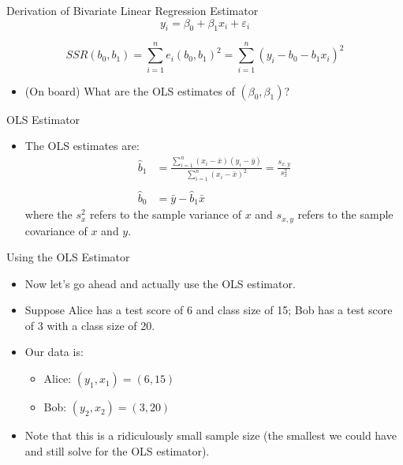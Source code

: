 \documentclass[english,xcolor={dvipsnames},aspectratio=169]{beamer}
\begin{document}


\begin{frame}{Derivation of Bivariate Linear Regression Estimator}
\[
	y_i = \beta_0 + \beta_1 x_i + \varepsilon_i
	\]

\[
		SSR\left(b_0,b_1\right) = \sum_{i=1}^{n} e_i \left(b_0,b_1\right)^2  =  \sum_{i=1}^{n} \left(y_i - b_{0} - b_{1} x_{i}\right)^{2} 
	\]


	\begin{itemize}
		\item (On board) What are the OLS estimates of $\left(\beta_0,\beta_1\right)$?
	\end{itemize}
\end{frame}

\begin{frame}{OLS Estimator}
	\begin{itemize}
\item The OLS estimates are:
\begin{align*}
\hat{b}_1 &=\frac{\sum\limits_{i=1}^n(x_i-\bar{x})(y_i-\bar{y})}{\sum\limits_{i=1}^n(x_i-\bar{x})^2}=\frac{s_{x,y}}{s_{x}^{2}} \\
\\
\hat{b}_0 & = \bar{y} - \hat{b}_1 \bar{x}
\end{align*}
where the $s_{x}^{2}$ refers to the sample variance of $x$ and $s_{x,y}$ refers to the sample covariance of $x$ and $y$.

	\end{itemize}
\end{frame}


\begin{frame}{Using the OLS Estimator}
\begin{itemize}
\item Now let's go ahead and actually use the OLS estimator.
\medskip
\item Suppose Alice has a test score of 6 and class size of 15; Bob has a test score of 3 with a class size of 20. 
\medskip
\item Our data is:
\begin{itemize}
\item Alice: $(y_1,x_1)=(6,15)$
\item Bob: $(y_2,x_2)=(3,20)$
\end{itemize}

\item Note that this is  a ridiculously small sample size (the smallest we could have and still solve for the OLS estimator). 
\end{itemize}
\end{frame}
\end{document}
